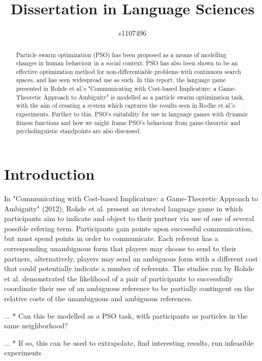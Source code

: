 \documentclass[12pt]{article}
\begin{document}
\title{Dissertation in Language Sciences}
\author{s1107496}

\maketitle

\begin{abstract}
Particle swarm optimization (PSO) has been proposed as a means of modelling changes in human behaviour in a social context. PSO has also been shown to be an effective optimization method for non-differentiable problems with continuous search spaces, and has seen widespread use as such. In this report, the language game presented in Rohde et al.'s "Communicating with Cost-based Implicature: a Game-Theoretic Approach to Ambiguity" is modelled as a particle swarm optimization task, with the aim of creating a system which captures the results seen in Rodhe et al.'s experiments. Further to this, PSO's suitability for use in language games with dynamic fitness functions and how we might frame PSO's behaviour from game-theoretic and psycholinguistic standpoints are also discussed.
\end{abstract}



\section{Introduction}
In "Communicating with Cost-based Implicature: a Game-Theoretic Approach to Ambiguity" (2012), Rohde et al. present an iterated language game in which participants aim to indicate and object to their partner via use of one of several possible refering term. Participants gain points upon successful communication, but must spend points in order to communicate. Each referent has a corresponding unambiguous form that players may choose to send to
their partners, alternatively, players may send an ambiguous form with a different cost that could potentially indicate a number of referents. The 
studies run by Rohde et al. demonstrated the likelihood of a pair of participants to successfully coordinate their use of an ambiguous reference to be partially contingent on the relative costs of the unambiguous and ambiguous references.

... * Can this be modelled as a PSO task, with participants as particles in the same neighborhood?

... * If so, this can be used to extrapolate, find interesting results, run infeasible experiments
\end{document}
